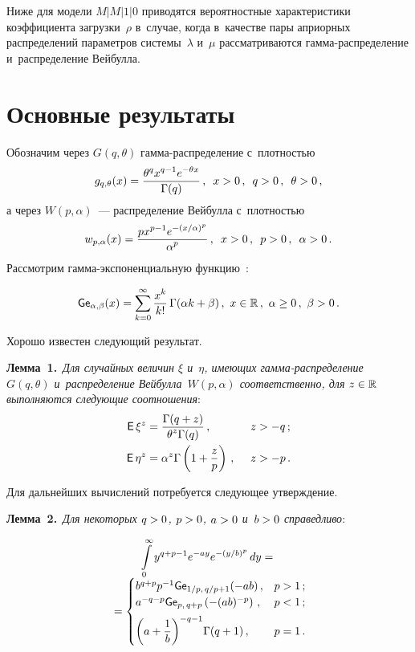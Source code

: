 \begin{multicols}{2}
Ниже для модели $M|M|1|0$ приводятся вероятностные характеристики коэффициента 
загрузки~$\rho$ в~случае, когда в~качестве пары априорных распределений параметров 
системы~$\lambda$ и~$\mu$ рас\-смат\-ри\-ва\-ют\-ся гам\-ма-рас\-пре\-де\-ле\-ние 
и~распределение Вей\-булла.
{ %

}

\section{Основные результаты}

Обозначим через $G(q, \theta)$ гам\-ма-рас\-пре\-де\-ле\-ние с~плот\-ностью
$$
g_{q, \theta}(x) = \displaystyle\frac{\displaystyle \theta^q x^{q-1}e^{-\theta x}\mathstrut}{\displaystyle {\Gamma(q)}\mathstrut}\,, \enskip
 x>0\,,\enskip q>0\,,\enskip \theta>0\,,
 $$
а через $W(p,\alpha)$~--- распределение Вейбулла с~плот\-ностью
$$
w_{p,\alpha}(x) = \displaystyle\frac{\displaystyle px^{p-1}e^{-({x/\alpha})^{p}}\mathstrut}{\displaystyle {\alpha^{p}}\mathstrut}\,,  \enskip
 x>0\,,\enskip  p>0\,,\enskip \alpha>0\,.
 $$
Рассмотрим гамма-экспоненциальную функцию~\cite{KuTi2017}:

\noindent
$$
{\sf Ge}_{\alpha, \beta} (x) = \sum\limits_{k=0}^{\infty}
\displaystyle\frac{\displaystyle x^k\mathstrut}{\displaystyle k!\mathstrut}\, \Gamma(\alpha k + \beta)\,,\enskip \!
x\in\mathbb{R}\,, \enskip\! \alpha\ge0\,, \enskip\! \beta> 0\,.
$$

Хорошо известен следующий результат.

\smallskip

\noindent
\textbf{Лемма~1.}\
\textit{Для случайных величин $\xi$ и~$\eta$, имеющих 
гам\-ма-рас\-пре\-де\-ле\-ние~$G(q, \theta)$ и~распределение Вейбулла~$W(p,\alpha)$
 соответственно, для $z\hm\in\mathbb{R}$ выполняются следующие соотношения}:
\begin{alignat*}{2}
{\sf E}\,\xi^z &= \fr{\Gamma(q+z)}{\theta^z\Gamma(q)}\,, &\enskip z &> -q\,; \\
{\sf E}\,\eta^z &= \alpha^z \Gamma\left(1+\fr{z}{p}\right)\,,&\enskip
 z &> -p\,.
 \end{alignat*}


\smallskip

Для дальнейших вычислений потребуется следующее утверждение.

\smallskip

\noindent
\textbf{Лемма~2.}\
\textit{Для некоторых $q\hm>0$, $p\hm>0$, $a\hm>0$ и~$b\hm>0$ справедливо}:

\noindent
\begin{multline*}
\int\limits_0^{\infty}y^{q+p-1}e^{-ay}e^{-(y/b)^p} \, dy ={}\\[-4pt]
{}=
 \begin{cases}
   {b^{q+p}{p^{-1}}}{\sf Ge}_{1/p,\, q/p+1} (-ab)\,, &p > 1\,;\\
   {{a^{-q-p}}}{\sf Ge}_{p,\, q+p} \left(-{{(ab)^{-p}}}\right)\,, &p < 1\,;\\[5pt]
   {{\left(a+\displaystyle\frac{\displaystyle 1\mathstrut}{\displaystyle b\mathstrut}\right)^{-q-1}}\Gamma(q+1)}\,, &p = 1\,.
 \end{cases}
\end{multline*}



\end{multicols}
